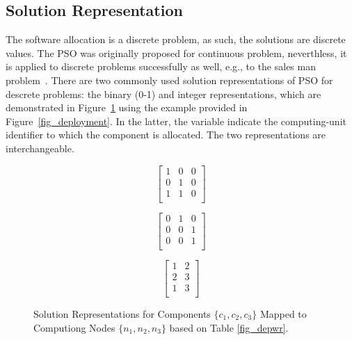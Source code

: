 \subsection{Solution Representation}
The software allocation is a discrete problem, as such, the solutions are discrete values. The PSO was originally proposed for continuous problem, neverthless, it is applied to discrete problems successfully as well, e.g., to the sales man problem~\cite{Clerc2000DiscreteProblem}. There are two commonly used solution representations of PSO for descrete problems: the binary (0-1) and integer representations, which are demonstrated in Figure~\ref{fig_solutionrep} using the example provided in Figure~\ref{fig_deployment}. In the latter, the variable indicate the computing-unit identifier to which the component is allocated. The two representations are interchangeable.
\begin{figure}
	\centering
		\begin{minipage}{.5\textwidth}
		\centering
				\begin{minipage}{.3\textwidth}
				\centering
				\begin{equation*}
				\begin{bmatrix} 
				1 & 0& 0\\
				0 & 1& 0\\
				1 &  1& 0\\
				\end{bmatrix}
				\end{equation*}
			\end{minipage}%
			\begin{minipage}{.3\textwidth}
				\centering
				\begin{equation*}
				\begin{bmatrix} 
				0 & 1& 0\\
				0 & 0& 1\\
				0 &  0& 1\\
				\end{bmatrix}
				\end{equation*}
			\end{minipage}
		\label{fig_binary}
	\end{minipage}
	\begin{minipage}{.4\textwidth}
		\centering
		\begin{equation*}
		\begin{bmatrix} 
		1 & 2\\
		2& 3\\
		1& 3\\
		\end{bmatrix}
		\end{equation*}
		\label{fig_integer}
	\end{minipage}
		\caption{Solution Representations for Components $\{c_1,c_2,c_3\}$ Mapped to Computiong Nodes $\{n_1,n_2,n_3\}$ based on Table \ref{fig_depwr}.}
		\label{fig_solutionrep}
\end{figure}

